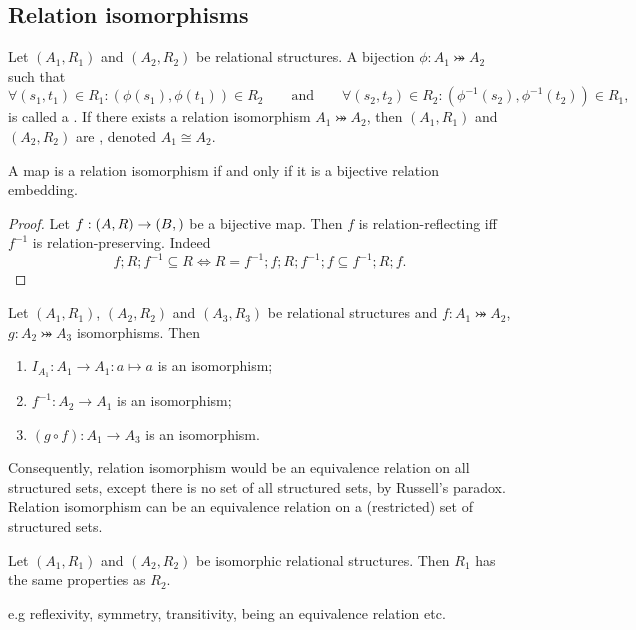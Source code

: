 \subsection{Relation isomorphisms}
\begin{definition}
Let $(A_1, R_1)$ and $(A_2, R_2)$ be relational structures. A bijection $\phi:A_1 \twoheadrightarrowtail A_2$ such that
\[ \forall (s_1,t_1)\in R_1: (\phi(s_1),\phi(t_1))\in R_2 \qquad \text{and} \qquad \forall (s_2,t_2)\in R_2: (\phi^{-1}(s_2),\phi^{-1}(t_2))\in R_1, \]
is called a . If there exists a relation isomorphism $A_1 \twoheadrightarrowtail A_2$, then $(A_1, R_1)$ and $(A_2, R_2)$ are , denoted $A_1 \cong A_2$.
\end{definition}

\begin{lemma}
A map is a relation isomorphism \textup{if and only if} it is a bijective relation embedding.
\end{lemma}
\begin{proof}
Let $f: \sSet{A, R}\to \sSet{B, }$ be a bijective map. Then $f$ is relation-reflecting iff $f^{-1}$ is relation-preserving. Indeed
\[ f;R;f^{-1} \subseteq R \iff R = f^{-1};f;R;f^{-1};f \subseteq f^{-1};R;f. \]
\end{proof}

\begin{lemma} \label{isomorphismEquivalence}
Let $(A_1, R_1)$, $(A_2, R_2)$ and $(A_3, R_3)$ be relational structures and $f:A_1 \twoheadrightarrowtail A_2$, $g:A_2 \twoheadrightarrowtail A_3$ isomorphisms. Then
\begin{enumerate}
\item $I_{A_1}: A_1 \to A_1: a\mapsto a$ is an isomorphism;
\item $f^{-1}: A_2\to A_1$ is an isomorphism;
\item $(g\circ f): A_1\to A_3$ is an isomorphism.
\end{enumerate}
\end{lemma}
Consequently, relation isomorphism would be an equivalence relation on all structured sets, except there is no set of all structured sets, by Russell's paradox. Relation isomorphism can be an equivalence relation on a (restricted) set of structured sets.

\begin{lemma}
Let $(A_1, R_1)$ and $(A_2, R_2)$ be isomorphic relational structures. Then $R_1$ has the same properties as $R_2$.
\end{lemma}
e.g\: reflexivity, symmetry, transitivity, being an equivalence relation etc.


